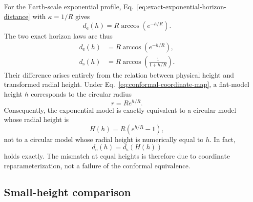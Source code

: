 For the Earth-scale exponential profile, Eq.~\eqref{eq:exact-exponential-horizon-distance}
with $\kappa=1/R$ gives
\begin{equation}
    d_{\mathrm{e}}(h)
    =
    R\arccos\!\left(e^{-h/R}\right).
    \label{eq:earth-scale-exponential-distance}
\end{equation}
The two exact horizon laws are thus
\begin{align}
    d_{\mathrm{e}}(h)
    &=
    R\arccos\!\left(e^{-h/R}\right),
    \\
    d_{\mathrm{s}}(h)
    &=
    R\arccos\!\left(\frac{1}{1+h/R}\right).
    \label{eq:refractive-spherical-pair}
\end{align}
Their difference arises entirely from the relation between physical height and
transformed radial height. Under Eq.~\eqref{eq:conformal-coordinate-map},
a flat-model height $h$ corresponds to the circular radius
\begin{equation}
    r=Re^{h/R}.
\end{equation}
Consequently, the exponential model is exactly equivalent to a circular model
whose radial height is
\begin{equation}
    H(h)
    =
    R\left(e^{h/R}-1\right),
    \label{eq:equivalent-radial-height}
\end{equation}
not to a circular model whose radial height is numerically equal to $h$. In
fact,
\begin{equation}
    d_{\mathrm{e}}(h)
    =
    d_{\mathrm{s}}\!\left(H(h)\right)
    \label{eq:exact-height-reparameterization}
\end{equation}
holds exactly. The mismatch at equal heights is therefore due to coordinate
reparameterization, not a failure of the conformal equivalence.

\subsection{Small-height comparison}

